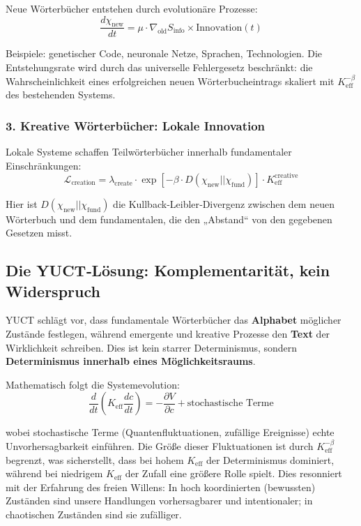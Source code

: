 \documentclass[12pt,a4paper]{article}
\newcommand{\eff}{\mathrm{eff}}
\newcommand{\Ke}{K_{\eff}}
\begin{document}
	Neue Wörterbücher entstehen durch evolutionäre Prozesse:
	\[
	\frac{d\chi_{\text{new}}}{dt} = \mu \cdot \nabla_{\text{old}} S_{\text{info}} \times \text{Innovation}(t)
	\]
	
	Beispiele: genetischer Code, neuronale Netze, Sprachen, Technologien. Die Entstehungsrate wird durch das universelle Fehlergesetz beschränkt: die Wahrscheinlichkeit eines erfolgreichen neuen Wörterbucheintrags skaliert mit $\Ke^{-\beta}$ des bestehenden Systems.
	
	\subsubsection{3. Kreative Wörterbücher: Lokale Innovation}
	
	Lokale Systeme schaffen Teilwörterbücher innerhalb fundamentaler Einschränkungen:
	\[
	\mathcal{L}_{\text{creation}} = \lambda_{\text{create}} \cdot \exp\left[-\beta \cdot D(\chi_{\text{new}} || \chi_{\text{fund}})\right] \cdot \Ke^{\text{creative}}
	\]
	
	Hier ist $D(\chi_{\text{new}} || \chi_{\text{fund}})$ die Kullback‑Leibler‑Divergenz zwischen dem neuen Wörterbuch und dem fundamentalen, die den „Abstand“ von den gegebenen Gesetzen misst.
	
	\subsection{Die YUCT‑Lösung: Komplementarität, kein Widerspruch}
	
	YUCT schlägt vor, dass fundamentale Wörterbücher das \textbf{Alphabet} möglicher Zustände festlegen, während emergente und kreative Prozesse den \textbf{Text} der Wirklichkeit schreiben. Dies ist kein starrer Determinismus, sondern \textbf{Determinismus innerhalb eines Möglichkeitsraums}.
	
	Mathematisch folgt die Systemevolution:
	\[
	\frac{d}{dt}\left( \Ke \frac{dc}{dt} \right) = -\frac{\partial V}{\partial c} + \text{stochastische Terme}
	\]
	
	wobei stochastische Terme (Quantenfluktuationen, zufällige Ereignisse) echte Unvorhersagbarkeit einführen. Die Größe dieser Fluktuationen ist durch $\Ke^{-\beta}$ begrenzt, was sicherstellt, dass bei hohem $\Ke$ der Determinismus dominiert, während bei niedrigem $\Ke$ der Zufall eine größere Rolle spielt. Dies resonniert mit der Erfahrung des freien Willens: In hoch koordinierten (bewussten) Zuständen sind unsere Handlungen vorhersagbarer und intentionaler; in chaotischen Zuständen sind sie zufälliger.
	
\end{document}
